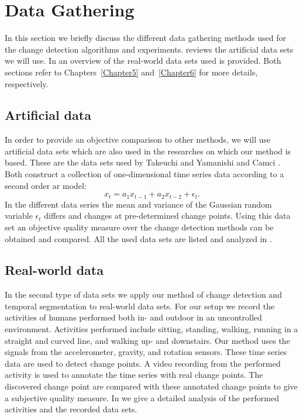 \section{Data Gathering}\label{sec:method_data_gathering}
In this section we briefly discuss the different data gathering methods used for the change detection algorithms and experiments.
 reviews the artificial data sets we will use.
In  an overview of the real-world data sets used is provided.
Both sections refer to Chapters~\ref{Chapter5} and~\ref{Chapter6} for more details, respectively.

\subsection{Artificial data}\label{subsec:data_gathering_artificial}
In order to provide an objective comparison to other methods, we will use artificial data sets which are also used in the researches on which our method is based.
These are the data sets used by Takeuchi and Yamanishi \cite{takeuchi2006unifying} and Camci \cite{camci2010change}.
Both construct a collection of one-dimensional time series data according to a second order \gls{ar} model:
\begin{equation}
  x_t = a_1 x_{t-1} + a_2 x_{t-2} + \epsilon_t.
\end{equation}
In the different data series the mean and variance of the Gaussian random variable $\epsilon_t$ differs and changes at pre-determined change points.
Using this data set an objective quality measure over the change detection methods can be obtained and compared.
All the used data sets are listed and analyzed in .

\subsection{Real-world data}\label{subsec:data_gathering_real_world}
In the second type of data sets we apply our method of change detection and temporal segmentation to real-world data sets.
For our setup we record the activities of humans performed both in- and outdoor in an uncontrolled environment.
Activities performed include sitting, standing, walking, running in a straight and curved line, and walking up- and downstairs.
Our method uses the signals from the accelerometer, gravity, and rotation sensors.
These time series data are used to detect change points.
A video recording from the performed activity is used to annotate the time series with real change points.
The discovered change point are compared with these annotated change points to give a subjective quality measure.
In  we give a detailed analysis of the performed activities and the recorded data sets.

